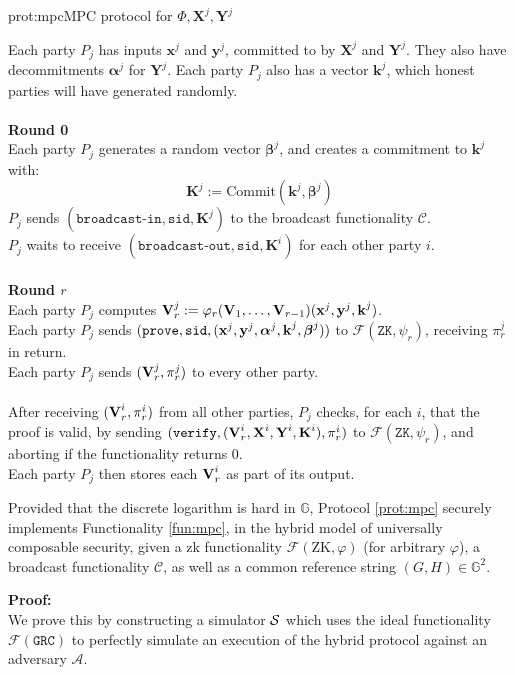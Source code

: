 \begin{aprotocol}{prot:mpc}{MPC protocol for $\Phi, \textbf{X}^j, \textbf{Y}^j$}

Each party $P_j$ has inputs $\textbf{x}^j$ and $\textbf{y}^j$, committed to
by $\textbf{X}^j$ and $\textbf{Y}^j$.
They also have decommitments $\boldsymbol{\alpha}^j$ for $\textbf{Y}^j$.
Each party $P_j$ also has a vector $\textbf{k}^j$, which honest parties will
have generated randomly.\\
\\
\textbf{Round 0}\\
Each party $P_j$ generates a random vector $\boldsymbol{\beta}^j$, and creates
a commitment to $\textbf{k}^j$ with:
$$
\textbf{K}^j := \text{Commit}(\textbf{k}^j, \boldsymbol{\beta}^j)
$$
$P_j$ sends $(\texttt{broadcast-in}, \texttt{sid}, \textbf{K}^j)$ to
the broadcast functionality $\mathcal{C}$.\\
$P_j$ waits to receive $(\texttt{broadcast-out}, \texttt{sid}, \textbf{K}^i)$
for each other party $i$.\\
\\
\textbf{Round $r$}\\
Each party $P_j$ computes $\textbf{V}^j_r := \varphi_r(\textbf{V}_1, \ldots, \textbf{V}_{r - 1})(\textbf{x}^j, \textbf{y}^j, \textbf{k}^j)$.\\
Each party $P_j$ sends $(\texttt{prove}, \texttt{sid}, (\textbf{x}^j, \textbf{y}^j, \boldsymbol{\alpha}^j, \textbf{k}^j, \boldsymbol{\beta}^j))$
to $\mathcal{F}(\texttt{ZK}, \psi_r)$, receiving $\pi^j_r$ in return.\\
Each party $P_j$ sends $(\textbf{V}^j_r, \pi^j_r)$ to every other party.\\
\\
After receiving $(\textbf{V}^i_r, \pi^i_r)$  from all other parties, $P_j$ checks,
for each $i$, that the proof is valid, by sending $(\texttt{verify}, (\textbf{V}^i_r, \textbf{X}^i, \textbf{Y}^i, \textbf{K}^i), \pi^i_r)$ to
$\mathcal{F}(\texttt{ZK}, \psi_r)$, and aborting if the functionality returns $0$.\\
Each party $P_j$ then stores each $\textbf{V}^i_r$ as part of its output.
\end{aprotocol}

\begin{claim}
Provided that the discrete logarithm is hard in $\mathbb{G}$, Protocol \ref{prot:mpc} securely implements Functionality \ref{fun:mpc},
in the hybrid model of universally composable security,
given a zk functionality $\mathcal{F}(\text{ZK}, \varphi)$ (for arbitrary $\varphi$),
a broadcast functionality $\mathcal{C}$, as well as a common reference string
${(G, H) \in \mathbb{G}^2}$.
\end{claim}
\textbf{Proof:}\\
We prove this by constructing a simulator $\mathcal{S}$ which uses
the ideal functionality $\mathcal{F}(\texttt{GRC})$ to perfectly
simulate an execution of the hybrid protocol against an adversary
$\mathcal{A}$.

